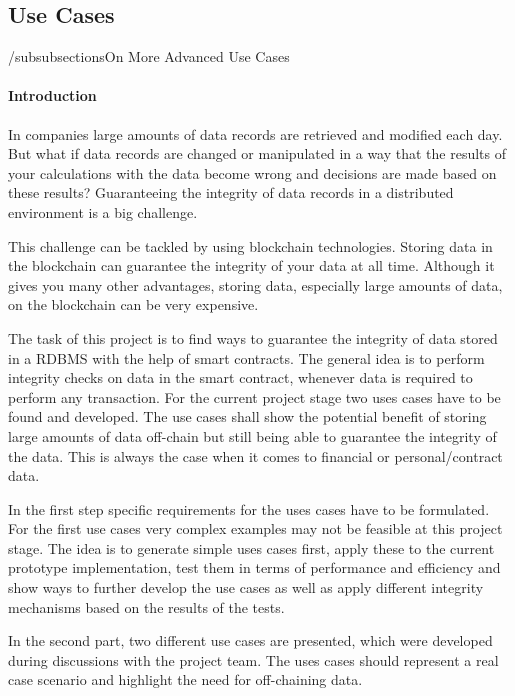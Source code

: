 \subsection{Use Cases} \label{sssec:use_cases}



/subsubsections{On More Advanced Use Cases}

\paragraph{Introduction}
In companies large amounts of data records are retrieved and modified each day. But what if data records are changed or manipulated in a way that the results of your calculations with the data become wrong and decisions are made based on these results? Guaranteeing the integrity of data records in a distributed environment is a big challenge.

This challenge can be tackled by using blockchain technologies. Storing data in the blockchain can guarantee the integrity of your data at all time. Although it gives you many other advantages, storing data, especially large amounts of data, on the blockchain can be very expensive.

The task of this project is to find ways to guarantee the integrity of data stored in a RDBMS with the help of smart contracts. The general idea is to perform integrity checks on data in the smart contract, whenever data is required to perform any transaction. For the current project stage two uses cases have to be found and developed. The use cases shall show the potential benefit of storing large amounts of data off-chain but still being able to guarantee the integrity of the data. This is always the case when it comes to financial or personal/contract data.

In the first step specific requirements for the uses cases have to be formulated. For the first use cases very complex examples may not be feasible at this project stage. The idea is to generate simple uses cases first, apply these to the current prototype implementation, test them in terms of performance and efficiency and show ways to further develop the use cases as well as apply different integrity mechanisms based on the results of the tests.

In the second part, two different use cases are presented, which were developed during discussions with the project team. The uses cases should represent a real case scenario and highlight the need for off-chaining data.

